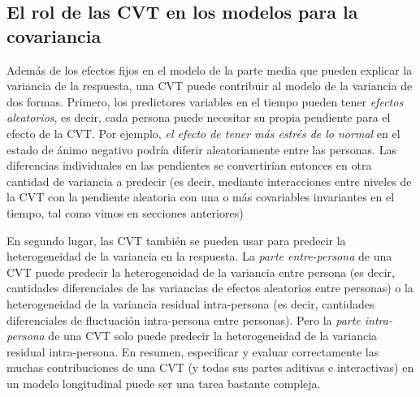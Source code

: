 \documentclass[spanish]{article}
\numberwithin{figure}{subsection}
\numberwithin{equation}{subsection}
\numberwithin{table}{subsection}
\begin{document}

\subsection{El rol de las CVT en los modelos para la covariancia}

Además de los efectos fijos en el modelo de la parte media que pueden explicar
la variancia de la respuesta, una CVT puede contribuir al modelo de la
variancia de dos formas. Primero, los predictores variables en el tiempo pueden
tener \textit{efectos aleatorios}, es decir, cada persona puede necesitar su
propia pendiente para el efecto de la CVT. Por ejemplo, \textit{el efecto de
tener más estrés de lo normal} en el estado de ánimo negativo podría diferir
aleatoriamente entre las personas. Las diferencias individuales en las
pendientes se convertirían entonces en otra cantidad de variancia a predecir
(es decir, mediante interacciones entre niveles de la CVT con la pendiente
aleatoria con una o más covariables invariantes en el tiempo, tal como vimos en
secciones anteriores)

En segundo lugar, las CVT también se pueden usar para predecir la
heterogeneidad de la variancia en la respuesta. La \textit{parte entre-persona}
de una CVT puede predecir la heterogeneidad de la variancia entre persona (es
decir, cantidades diferenciales de las variancias de efectos aleatorios entre
personas) o la heterogeneidad de la variancia residual intra-persona (es decir,
cantidades diferenciales de fluctuación intra-persona entre personas). Pero la
\textit{parte intra-persona} de una CVT solo puede predecir la heterogeneidad
de la variancia residual intra-persona. En resumen, especificar y evaluar
correctamente las muchas contribuciones de una CVT (y todas sus partes aditivas
e interactivas) en un modelo longitudinal puede ser una tarea bastante
compleja.



\newpage
\nocite{*}
\renewcommand{\refname}{Bibliografía}

\end{document}
